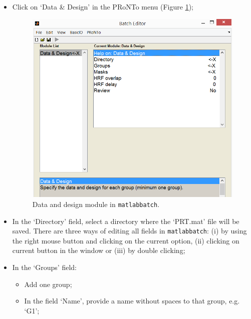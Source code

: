 \begin{itemize}

	\item Click on `Data \& Design' in the PRoNTo menu (Figure \ref{fig:batchData});
	
	\begin{figure}[h!]
	
	\centering
		\includegraphics[scale=0.6]{images/Tutorial/classification/batchData.png}
	\caption{Data and design module in {\tt matlabbatch}. }
	\label{fig:batchData}
	
	\end{figure}

	\item In the `Directory' field, select a directory where the `PRT.mat' file will be saved. There are three ways of editing all fields in {\tt matlabbatch}: (i) by using the right mouse button and clicking on the current option, (ii) clicking on current button in the window or (iii) by double clicking;
	
	\item In the `Groups' field:
 	
		\begin{itemize}
		
		\item Add one group;
		
		\item In the field `Name', provide a name without spaces to that group, e.g. `G1'; 
		

\end{itemize}
\end{itemize}
